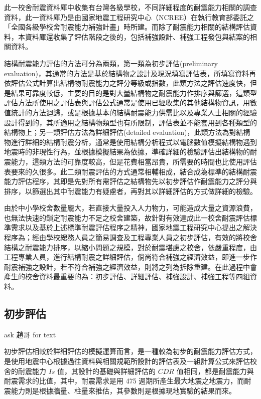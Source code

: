 此一校舍耐震資料庫中收集有台灣各級學校，不同詳細程度的耐震能力相關的調查資料，此一資料庫乃是由國家地震工程研究中心（NCREE）在執行教育部委託之「全國各級學校舍耐震能力補強計畫」時所建。而除了耐震能力相關的結構評估資料，本資料庫還收集了評估階段之後的，包括補強設計、補強工程發包與結案的相關資料。

結構耐震能力評估的方法可分為兩類，第一類為初步評估(preliminary evaluation)，其通常的方法是基於結構物之設計及現況填寫評估表，所填寫資料再依評估公式計算出結構物耐震能力之評分等級或指數，此類方法之評估速度快，但是結果可靠度較低，主要的目的是對大量結構物之耐震能力作排序與篩選，這類型評估方法所使用之評估表與評估公式通常是使用已經收集的其他結構物資訊，用數值統計的方法迴歸，或是根據基本的結構耐震能力供需比以及專業人士相關的經驗設計得到的，其所適用之結構物類型也有所限制，評估表並不能套用到各種類型的結構物上；另一類評估方法為詳細評估(detailed evaluation)，此類方法為對結構物進行詳細的結構耐震分析，通常是使用結構分析程式以電腦數值模擬結構物遇到地震時的非現性行為，並根據模擬結果為依據，準確詳細的檢驗評估出結構物的耐震能力，這類方法的可靠度較高，但是花費相當昂貴，所需要的時間也比使用評估表要來的久很多。此二類耐震評估的方式通常相輔相成，結合成為標準的結構耐震能力評估程序，其即是先對所有需評估之結構物先以初步評估作耐震能力之評分與排序，以篩選出其中耐震能力有疑慮者，再對其以詳細評估的方式做詳細的檢驗。

由於中小學校舍數量龐大，若直接大量投入人力物力，可能造成大量之資源浪費，也無法快速的鎖定耐震能力不足之校舍建築，故針對有效達成此一校舍耐震評估標準需求以及基於上述標準耐震評估程序之精神，國家地震工程研究中心提出之解決程序為；經由學校總務人員之簡易調查及工程專業人員之初步評估，有效的將校舍結構之耐震能力排序，以縮小問題之規模，對於耐震堪慮之校舍，依嚴重程度，由工程專業人員，進行結構耐震之詳細評估，倘尚符合補強之經濟效益，即進一步作耐震補強之設計，若不符合補強之經濟效益，則將之列為拆除重建。在此過程中會產生的校舍資料最重要的為：初步評估、詳細評估、補強設計、補強工程等四組資料。

\subsection{初步評估}

ask 趙哥 for text

初步評估相較於詳細評估的模擬運算而言，是一種較為初步的耐震能力評估方式，是使用地震中心根據過往資料與相關規範所設計的評估表及一組計算公式來評估校舍的耐震能力 $Is$ 值，其設計的基礎與詳細評估的 $CDR$ 值相同，都是耐震能力與耐震需求的比值，其中，耐震需求是用 475 週期所產生最大地震之地震力，而耐震能力則是根據牆量、柱量來推估，其參數則是根據現地實驗的結果而來。

